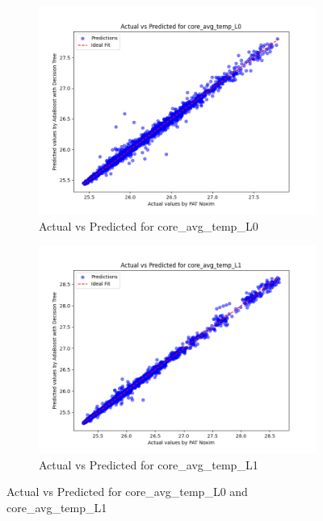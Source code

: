 \documentclass[conference]{IEEEtran}
\begin{document}
\begin{figure}[htbp]
    \centering
    \begin{subfigure}{0.24\textwidth}
        \includegraphics[width=\linewidth]{actual_vs_predicted_core_avg_temp_L0.png}
        \caption{Actual vs Predicted for core\_avg\_temp\_L0}
        \label{fig:actual_vs_predicted_core_avg_temp_L0}
    \end{subfigure}
    \hfill
    \begin{subfigure}{0.24\textwidth}
        \centering
        \includegraphics[width=\linewidth]{actual_vs_predicted_core_avg_temp_L1.png}
        \caption{Actual vs Predicted for core\_avg\_temp\_L1}
        \label{fig:actual_vs_predicted_core_avg_temp_L1}
    \end{subfigure}

    \caption{Actual vs Predicted for core\_avg\_temp\_L0 and core\_avg\_temp\_L1}
    \label{fig:side_by_side_graphs_core_avg_temp}
\end{figure}
\end{document}
